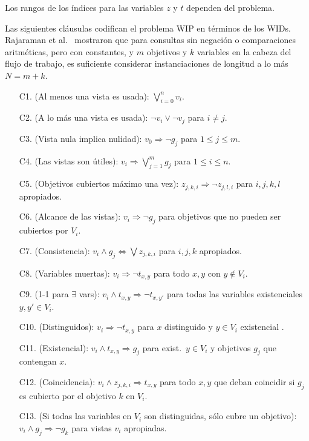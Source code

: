 Los rangos de los índices para las variables $z$ y $t$ dependen del problema.

Las siguientes cláusulas codifican el problema WIP en términos de los WIDs.
Rajaraman et al.\ \cite{RajaramanSU95} mostraron que para consultas sin negación
o comparaciones aritméticas, pero con constantes, y $m$ objetivos y $k$
variables en la cabeza del flujo de trabajo, es suficiente considerar
instanciaciones de longitud a lo más $N=m+k$.

\begin{enumerate}[C10.]
\item[C1.] (Al menos una vista es usada): $\bigvee_{i=0}^n v_i$.
\item[C2.] (A lo más una vista es usada): $\neg v_i\lor\neg v_j$ para $i\neq j$.
\item[C3.] (Vista nula implica nulidad): $v_0 \Rightarrow \neg g_j$ para $1\leq j\leq m$.
\item[C4.] (Las vistas son útiles): $v_i \Rightarrow \bigvee_{j=1}^m g_j$ para $1\leq i\leq n$.
\item[C5.] (Objetivos cubiertos máximo una vez): $z_{j,k,i} \Rightarrow \neg z_{j,l,i}$ para $i,j,k,l$ apropiados.
\item[C6.] (Alcance de las vistas): $v_i \Rightarrow \neg g_j$ para objetivos que no pueden ser cubiertos por $V_i$.
\item[C7.] (Consistencia): $v_i \land g_j \Leftrightarrow \bigvee z_{j,k,i}$ para $i,j,k$ apropiados.
\item[C8.] (Variables muertas): $v_i \Rightarrow \neg t_{x,y}$ para todo $x,y$ con $y\notin V_i$.
\item[C9.] (1-1 para $\exists$ vars): $v_i \land t_{x,y} \Rightarrow \neg t_{x,y'}$ para todas las variables existenciales $y,y'\in V_i$.
\item[C10.] (Distinguidos): $v_i \Rightarrow \neg t_{x,y}$ para $x$ distinguido y $y\in V_i$ existencial .
\item[C11.] (Existencial): $v_i\land t_{x,y}\Rightarrow g_j$ para exist.\ $y\in V_i$ y objetivos $g_j$ que contengan $x$.
\item[C12.] (Coincidencia): $v_i\land z_{j,k,i} \Rightarrow t_{x,y}$ para todo
$x,y$ que deban coincidir si $g_j$ es cubierto por el objetivo $k$ en $V_i$.
\item[C13.] (Si todas las variables en $V_i$ son distinguidas, sólo cubre un objetivo): $v_i \land g_j \Rightarrow \neg g_k$ para vistas $v_i$ apropiadas.
\end{enumerate}

